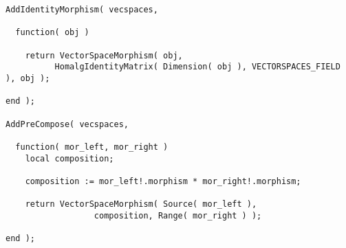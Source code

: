 \begin{small}
\begin{Verbatim}[commandchars=!@\%,frame=single]
AddIdentityMorphism( vecspaces,
                     
  function( obj )

    return VectorSpaceMorphism( obj,
          HomalgIdentityMatrix( Dimension( obj ), VECTORSPACES_FIELD ), obj );
    
end );

AddPreCompose( vecspaces,

  function( mor_left, mor_right )
    local composition;

    composition := mor_left!.morphism * mor_right!.morphism;

    return VectorSpaceMorphism( Source( mor_left ),
                  composition, Range( mor_right ) );

end );
\end{Verbatim}
\end{small}